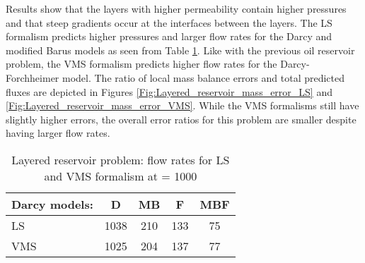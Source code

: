 \documentclass[11pt,reqno]{amsart}
\begin{document}
Results show that the layers with higher permeability contain higher pressures and that 
steep gradients occur at the interfaces between the layers. The LS formalism predicts higher pressures 
and larger flow rates for the Darcy and modified Barus models as seen from Table 
\ref{Tab:layered_reservoir_flowrates}. Like with the previous oil reservoir problem, 
the VMS formalism predicts higher flow rates for the Darcy-Forchheimer model. 
The ratio of local mass balance errors and total predicted fluxes are depicted in 
Figures \ref{Fig:Layered_reservoir_mass_error_LS} and \ref{Fig:Layered_reservoir_mass_error_VMS}. 
While the VMS formalisms still have slightly higher errors, the overall error ratios for this problem 
are smaller despite having larger flow rates.
\begin{table}[t!]
  \centering
  \caption{Layered reservoir problem: flow rates for LS and VMS formalism at  = 1000}
  \begin{tabular}{l|cccc}
    \hline
    Darcy models: & D & MB & F & MBF \\ \hline
    LS & 1038 & 210 & 133 & 75 \\
    VMS & 1025 & 204 & 137 & 77 \\
    \hline
  \end{tabular}
  \label{Tab:layered_reservoir_flowrates}
\end{table}
\end{document}
